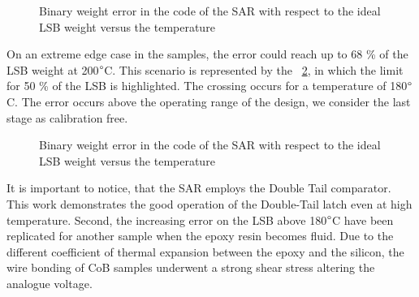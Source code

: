 \begin{figure}[htp]
    \centering
    
    \caption{Binary weight error in the code of the SAR with respect to the ideal LSB weight versus the temperature}
    \label{fig:sar-test-coef_doe05_11}
\end{figure}

On an extreme edge case in the samples, the error could reach up to 68 \% of the LSB weight at 200$\degree$C. This scenario is represented by the \figurename~\ref{fig:sar-test-coef_doe05_13}, in which the limit for 50 \% of the LSB is highlighted. The crossing occurs for a temperature of 180$\degree$C. The error occurs above the operating range of the design, we consider the last stage as calibration free.

\begin{figure}[htp]
    \centering
    
    \caption{Binary weight error in the code of the SAR with respect to the ideal LSB weight versus the temperature}
    \label{fig:sar-test-coef_doe05_13}
\end{figure}

It is important to notice, that the SAR employs the Double Tail comparator. This work demonstrates the good operation of the Double-Tail latch even at high temperature. Second, the increasing error on the LSB above 180$\degree$C have been replicated for another sample when the epoxy resin becomes fluid. Due to the different coefficient of thermal expansion between the epoxy and the silicon, the wire bonding of CoB samples underwent a strong shear stress altering the analogue voltage.
